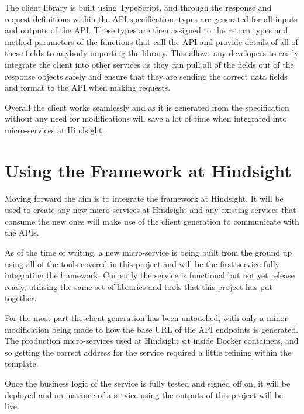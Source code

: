 The client library is built using TypeScript, and through the response and request definitions within the API specification, types are generated for all inputs and outputs of the API. These types are then assigned to the return types and method parameters of the functions that call the API and provide details of all of these fields to anybody importing the library. This allows any developers to easily integrate the client into other services as they can pull all of the fields out of the response objects safely and ensure that they are sending the correct data fields and format to the API when making requests.

Overall the client works seamlessly and as it is generated from the specification without any need for modifications will save a lot of time when integrated into micro-services at Hindsight.
\section{Using the Framework at Hindsight}
Moving forward the aim is to integrate the framework at Hindsight. It will be used to create any new micro-services at Hindsight and any existing services that consume the new ones will make use of the client generation to communicate with the APIs.

As of the time of writing, a new micro-service is being built from the ground up using all of the tools covered in this project and will be the first service fully integrating the framework. Currently the service is functional but not yet release ready, utilising the same set of libraries and tools that this project has put together. 

For the most part the client generation has been untouched, with only a minor modification being made to how the base URL of the API endpoints is generated. The production micro-services used at Hindsight sit inside Docker containers, and so getting the correct address for the service required a little refining within the template. 

Once the business logic of the service is fully tested and signed off on, it will be deployed and an instance of a service using the outputs of this project will be live.
